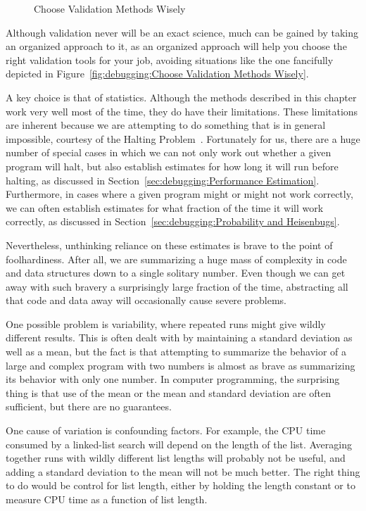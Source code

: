 \begin{figure}[tbp]
\centering
{}
\caption{Choose Validation Methods Wisely}
\end{figure}

Although validation never will be an exact science, much can be gained
by taking an organized approach to it, as an organized approach will
help you choose the right validation tools for your job, avoiding
situations like the one fancifully depicted in
Figure~\ref{fig:debugging:Choose Validation Methods Wisely}.

A key choice is that of statistics.
Although the methods described in this chapter work very well most of
the time, they do have their limitations.
These limitations are inherent because we are attempting to do something
that is in general impossible, courtesy of the
Halting Problem~\cite{AlanMTuring1937HaltingProblem,GeoffreyKPullum2000HaltingProblem}.
Fortunately for us, there are a huge number of special cases in which
we can not only work out whether a given program will halt, but also
establish estimates for how long it will run before halting, as discussed in
Section~\ref{sec:debugging:Performance Estimation}.
Furthermore, in cases where a given program might or might not work
correctly, we can often establish estimates for what fraction of the
time it will work correctly, as discussed in
Section~\ref{sec:debugging:Probability and Heisenbugs}.

Nevertheless, unthinking reliance on these estimates is brave to the
point of foolhardiness.
After all, we are summarizing a huge mass of complexity in code and
data structures down to a single solitary number.
Even though we can get away with such bravery a surprisingly large
fraction of the time, abstracting all that code and data away will
occasionally cause severe problems.

One possible problem is variability, where repeated runs might give
wildly different results.
This is often dealt with by maintaining a standard deviation as well
as a mean, but the fact is that attempting to summarize the behavior
of a large and complex program with two numbers is almost as brave as
summarizing its behavior with only one number.
In computer programming, the surprising thing is that use of the
mean or the mean and standard deviation are often sufficient, but
there are no guarantees.

One cause of variation is confounding factors.
For example, the CPU time consumed by a linked-list search will depend
on the length of the list.
Averaging together runs with wildly different list lengths will
probably not be useful, and adding a standard deviation to the mean
will not be much better.
The right thing to do would be control for list length, either by
holding the length constant or to measure CPU time as a function of
list length.

